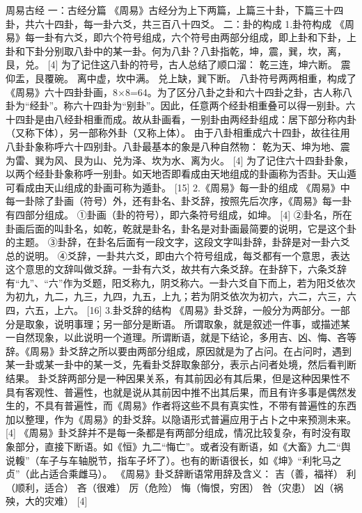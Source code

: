 \documentclass[a4paper,12pt,UTF8,twoside]{ctexbook}
\begin{document}
周易古经
一：古经分篇
《周易》古经分为上下两篇，上篇三十卦，下篇三十四卦，共六十四卦，每一卦六爻，共三百八十四爻。
二：卦的构成
1.卦符构成
《周易》每一卦有六爻，即六个符号组成，六个符号由两部分组成，即上卦和下卦，上卦和下卦分别取八卦中的某一卦。何为八卦？八卦指乾，坤，震，巽，坎，离，艮，兑。 [4]
为了记住这八卦的符号，古人总结了顺口溜：
乾三连，坤六断。
震仰盂，艮覆碗。
离中虚，坎中满。
兑上缺，巽下断。
八卦符号两两相重，构成了《周易》六十四卦卦画，8×8=64。为了区分八卦之卦和六十四卦之卦，古人称八卦为“经卦”。称六十四卦为“别卦”。因此，任意两个经卦相重叠可以得一别卦。六十四卦是由八经卦相重而成。故从卦画看，一别卦由两经卦组成：居下部分称内卦（又称下体），另一部称外卦（又称上体）。
由于八卦相重成六十四卦，故往往用八卦卦象称呼六十四别卦。八卦最基本的象是八种自然物：
乾为天、坤为地、震为雷、巽为风、艮为山、兑为泽、坎为水、离为火。 [4]
为了记住六十四卦卦象，以两个经卦卦象称呼一别卦。如天地否即看成由天地组成的卦画称为否卦。天山遁可看成由天山组成的卦画可称为遁卦。 [15]
2.《周易》每一卦的组成
《周易》中每一卦除了卦画（符号）外，还有卦名、卦爻辞，按照先后次序，《周易》每一卦有四部分组成。
①卦画（卦的符号），即六条符号组成，如坤。 [4]
②卦名，所在卦画后面的叫卦名，如乾，乾就是卦名，卦名是对卦画最简要的说明，它是这个卦的主题。
③卦辞，在卦名后面有一段文字，这段文字叫卦辞，卦辞是对一卦六爻总的说明。
④爻辞，一卦共六爻，即由六个符号组成，每爻都有一个意思，表达这个意思的文辞叫做爻辞。一卦有六爻，故共有六条爻辞。在卦辞下，六条爻辞有“九”、“六”作为爻题，阳爻称九，阴爻称六。一卦六爻自下而上，若为阳爻依次为初九，九二，九三，九四，九五，上九；若为阴爻依次为初六，六二，六三，六四，六五，上六。 [16]
3.卦爻辞的结构
《周易》卦爻辞，一般分为两部分。一部分是取象，说明事理；另一部分是断语。
所谓取象，就是叙述一件事，或描述某一自然现象，以此说明一个道理。所谓断语，就是下结论，多用吉、凶、悔、吝等辞。《周易》卦爻辞之所以要由两部分组成，原因就是为了占问。在占问时，遇到某一卦或某一卦中的某一爻，先看卦爻辞取象部分，表示占问者处境，然后看判断结果。
卦爻辞两部分是一种因果关系，有其前因必有其后果，但是这种因果性不具有客观性、普遍性，也就是说从其前因中推不出其后果，而且有许多事是偶然发生的，不具有普遍性，而《周易》作者将这些不具有真实性，不带有普遍性的东西加以整理，作为《周易》的卦爻辞。以隐语形式普遍应用于占卜之中来预测未来。 [4]
《周易》卦爻辞并不是每一条都是有两部分组成，情况比较复杂，有时没有取象部分，直接下断语。如《恒》九二“悔亡”。或者没有断语，如《大畜》九二“舆说輹”（车子与车轴脱节，指车子坏了）。也有的断语很长，如《坤》“利牝马之贞”（此占适合乘雌马）。
《周易》卦爻辞断语常用辞及含义：
吉（善，福祥）
利（顺利，适合）
吝（很难）
厉（危险）
悔（悔恨，穷困）
咎（灾患）
凶（祸殃，大的灾难） [4]
\end{document}
